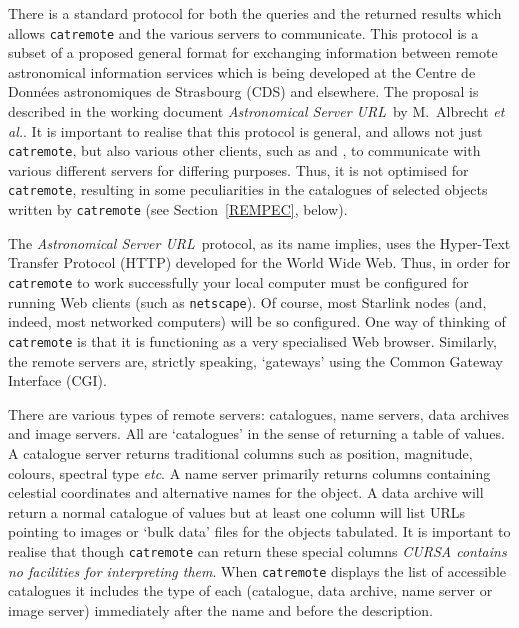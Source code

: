 \documentclass[twoside,11pt]{starlink}
\begin{document}
There is a standard protocol for both the queries and the returned
results which allows \texttt{catremote} and the various servers to
communicate.  This protocol is a subset of a proposed general format
for exchanging information between remote astronomical information services
which is being developed at the Centre de Donn\'{e}es astronomiques de
Strasbourg (CDS) and elsewhere.  The proposal is described in the
working document \textit{Astronomical Server URL}\, by M.~Albrecht \textit{et
al.}\cite{SERVERURL}.  It is important to realise that this protocol
is general, and allows not just \texttt{catremote}, but also various other
clients, such as \cite{SUN214} and
,
to communicate with various different servers for differing purposes.
Thus, it is not optimised for \texttt{catremote}, resulting in some
peculiarities in the catalogues of selected objects written by \texttt{catremote} (see Section~\ref{REMPEC}, below).

The \textit{Astronomical Server URL}\, protocol, as its name implies, uses
the Hyper-Text Transfer Protocol (HTTP) developed for the World Wide
Web.  Thus, in order for \texttt{catremote} to work successfully your
local computer must be configured for running Web clients (such as \texttt{netscape}).  Of course, most Starlink nodes (and, indeed, most networked
computers) will be so configured.  One way of thinking of \texttt{catremote} is that it is functioning as a very specialised Web browser.
Similarly, the remote servers are, strictly speaking, `gateways'
using the Common Gateway Interface (CGI).

There are various types of remote servers: catalogues, name servers,
data archives and image servers.  All are `catalogues' in the sense of
returning a table of values.  A catalogue server returns traditional
columns such as position, magnitude, colours, spectral type \emph{etc}.
A name server primarily returns columns containing celestial coordinates
and alternative names for the object.  A data archive will return a normal
catalogue of values but at least one column will list URLs pointing to
images or `bulk data' files for the objects tabulated.  It is important to
realise that though \texttt{catremote} can return these special columns \textit{CURSA contains no facilities for interpreting them}.  When \texttt{catremote}
displays the list of accessible catalogues it includes the type of each
(catalogue, data archive, name server or image server) immediately after
the name and before the description.
\end{document}
